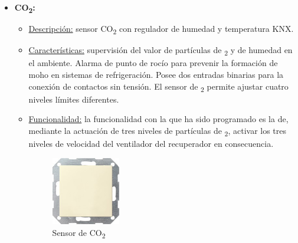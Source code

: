 \begin{itemize}
\item \textbf{CO\textsubscript{2}:} 
	\begin{itemize}
	\item\underline{Descripción:} sensor CO\textsubscript{2} con regulador de humedad y temperatura KNX.
	\item \underline{Características:} supervisión del valor de partículas de \textsubscript{2} y de humedad en el ambiente. Alarma de punto de rocío para prevenir la formación de moho en sistemas de refrigeración. Posee dos entradas binarias para la conexión de contactos sin tensión. El sensor de \textsubscript{2} permite ajustar cuatro niveles límites diferentes.
	\item \underline{Funcionalidad:} la funcionalidad con la que ha sido programado es la de, mediante la actuación de tres niveles de partículas de \textsubscript{2}, activar los tres niveles de velocidad del ventilador del recuperador en consecuencia.
	\begin{figure}[H]
	\centering
	\includegraphics[width=0.30\textwidth]{figures/sensor_co2.jpg}   
	\caption{Sensor de CO\textsubscript{2}}
	\label{fig:sensor_co2}
	\end{figure}
	\end{itemize} 



\end{itemize}
